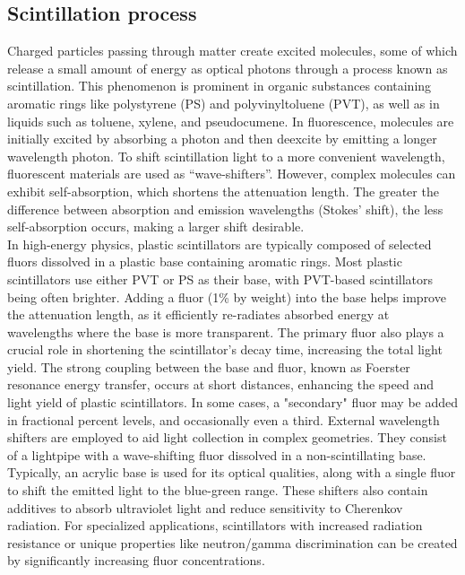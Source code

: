 \begin{refsection}
    \subsection{Scintillation process}
        Charged particles passing through matter create excited molecules, some of which release a small amount of energy as optical photons through a process known as scintillation. This phenomenon is prominent in organic substances containing aromatic rings like polystyrene (PS) and polyvinyltoluene (PVT), as well as in liquids such as toluene, xylene, and pseudocumene.
        In fluorescence, molecules are initially excited by absorbing a photon and then deexcite by emitting a longer wavelength photon. To shift scintillation light to a more convenient wavelength, fluorescent materials are used as ``wave-shifters''.
        However, complex molecules can exhibit self-absorption, which shortens the attenuation length. 
        The greater the difference between absorption and emission wavelengths (Stokes' shift), the less self-absorption occurs, making a larger shift desirable.\\
        
        \noindent
        In high-energy physics, plastic scintillators are typically composed of selected fluors dissolved in a plastic base containing aromatic rings. Most plastic scintillators use either PVT or PS as their base, with PVT-based scintillators being often brighter. 
        Adding a fluor (1\% by weight) into the base helps improve the attenuation length, as it efficiently re-radiates absorbed energy at wavelengths where the base is more transparent.
        The primary fluor also plays a crucial role in shortening the scintillator's decay time, increasing the total light yield. 
        The strong coupling between the base and fluor, known as Foerster resonance energy transfer, occurs at short distances, enhancing the speed and light yield of plastic scintillators.
        In some cases, a "secondary" fluor may be added in fractional percent levels, and occasionally even a third.
        External wavelength shifters are employed to aid light collection in complex geometries. They consist of a lightpipe with a wave-shifting fluor dissolved in a non-scintillating base. Typically, an acrylic base is used for its optical qualities, along with a single fluor to shift the emitted light to the blue-green range. These shifters also contain additives to absorb ultraviolet light and reduce sensitivity to Cherenkov radiation.
        \noindent
        For specialized applications, scintillators with increased radiation resistance or unique properties like neutron/gamma discrimination can be created by significantly increasing fluor concentrations.
        

\end{refsection}
